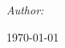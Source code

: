 \begin{titlepage}
    
    \begin{flushcenter} \large
    \emph{Author:} \@author
    \end{flushcenter}
    
    
    \vfill %
    {\large \today}\\[2cm] %
    
    \vfill %
    \end{titlepage}
